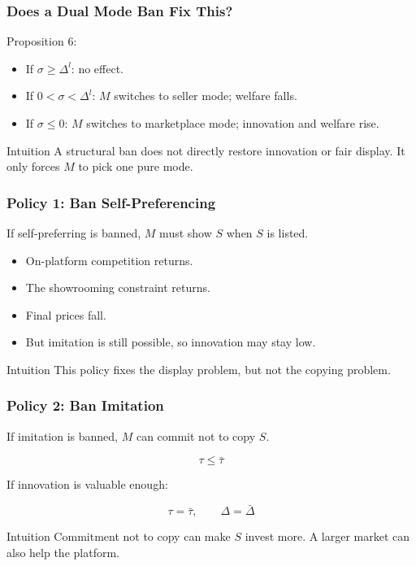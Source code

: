 \begin{frame}
  \frametitle{Does a Dual Mode Ban Fix This?}
  \small
  Proposition 6:

  \begin{itemize}
    \item If $\sigma\geq\Delta^l$: no effect.
    \item If $0<\sigma<\Delta^l$: $M$ switches to seller mode; welfare falls.
    \item If $\sigma\leq0$: $M$ switches to marketplace mode; innovation and welfare rise.
  \end{itemize}

  \begin{alertblock}{Intuition}
    A structural ban does not directly restore innovation or fair display. It only forces $M$ to pick one pure mode.
  \end{alertblock}
\end{frame}

\begin{frame}
  \frametitle{Policy 1: Ban Self-Preferencing}
  \small
  If self-preferring is banned, $M$ must show $S$ when $S$ is listed.

  \begin{itemize}
    \item On-platform competition returns.
    \item The showrooming constraint returns.
    \item Final prices fall.
    \item But imitation is still possible, so innovation may stay low.
  \end{itemize}

  \begin{block}{Intuition}
    This policy fixes the display problem, but not the copying problem.
  \end{block}
\end{frame}

\begin{frame}
  \frametitle{Policy 2: Ban Imitation}
  \small
  If imitation is banned, $M$ can commit not to copy $S$.

  \begin{equation*}
    \tau\leq\bar{\tau}
  \end{equation*}

  If innovation is valuable enough:

  \begin{equation*}
    \tau=\bar{\tau}, \qquad \Delta=\bar{\Delta}
  \end{equation*}

  \begin{block}{Intuition}
    Commitment not to copy can make $S$ invest more. A larger market can also help the platform.
  \end{block}
\end{frame}

